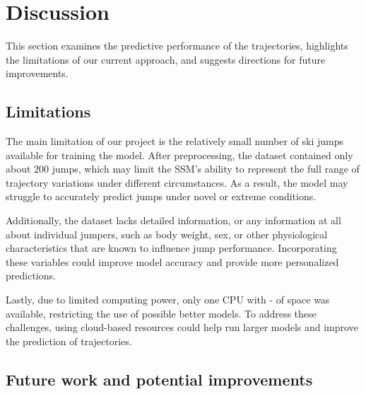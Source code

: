 \documentclass[sigconf,natbib=false, language=english]{acmart}
\begin{document}

\section{Discussion}
\label{sec:discussion}



This section examines the predictive performance of the trajectories, highlights the 
limitations of our current approach, and suggests directions for future improvements.

\subsection{Limitations}

The main limitation of our project is the relatively small number of ski jumps 
available for training the model. After preprocessing, the dataset contained 
only about $200$ jumps, which may limit the SSM's ability to represent the full 
range of trajectory variations under different circumstances. As a result, the 
model may struggle to accurately predict jumps under novel or extreme conditions.

Additionally, the dataset lacks detailed information, or any information at all 
about individual jumpers, such as body weight, sex, or other physiological characteristics 
that are known to influence jump performance. Incorporating these variables 
could improve model accuracy and provide more personalized predictions. \cite{muller2008performance}

Lastly, due to limited computing power, only one CPU with - of space was 
available, restricting the use of possible better models. To address these 
challenges, using cloud-based resources could help run larger models and 
improve the prediction of trajectories.

\subsection{Future work and potential improvements}
\end{document}
